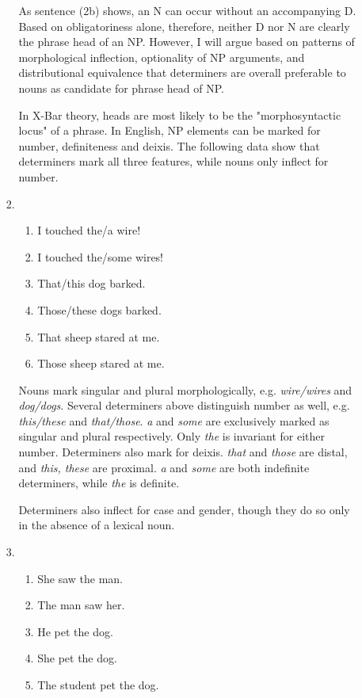 \documentclass[12pt]{article}
\begin{document}
\begin{enumerate}
\begin{enumerate}
\begin{enumerate}[label=(\arabic*)]
As sentence (2b) shows, an N can occur without an accompanying D. Based on obligatoriness alone, therefore, neither D nor N are clearly the phrase head of an NP. However, I will argue based on patterns of morphological inflection, optionality of NP arguments, and distributional equivalence that determiners are overall preferable to nouns as candidate for phrase head of NP.

In X-Bar theory, heads are most likely to be the "morphosyntactic locus" of a phrase. In English, NP elements can be marked for number, definiteness and deixis. The following data show that determiners mark all three features, while nouns only inflect for number.
\item
\begin{enumerate}[label=\alph*.]
\item I touched the/a wire!
\item I touched the/some wires!
\item That/this dog barked.
\item Those/these dogs barked.
\item That sheep stared at me.
\item Those sheep stared at me.
\end{enumerate}

Nouns mark singular and plural morphologically, e.g. \emph{wire/wires} and \emph{dog/dogs}. Several determiners above distinguish number as well, e.g. \emph{this/these} and \emph{that/those}. \emph{a} and \emph{some} are exclusively marked as singular and plural respectively. Only \emph{the} is invariant for either number. Determiners also mark for deixis. \emph{that} and \emph{those} are distal, and \emph{this, these} are proximal. \emph{a} and \emph{some} are both indefinite determiners, while \emph{the} is definite. 

Determiners also inflect for case and gender, though they do so only in the absence of a lexical noun.

\item
\begin{enumerate}[label=\alph*.]
\item She saw the man.
\item The man saw her.
\item He pet the dog.
\item She pet the dog.
\item The student pet the dog.
\end{enumerate}


\end{enumerate}
\end{enumerate}
\end{enumerate}
\end{document}
